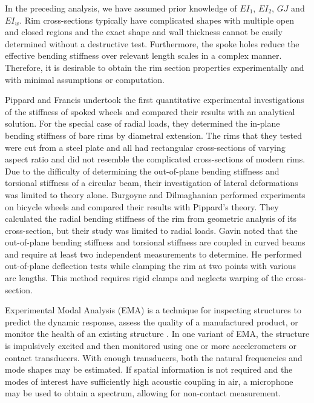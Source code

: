 \documentclass[../thesis.tex]{subfiles}
\begin{document}
In the preceding analysis, we have assumed prior knowledge of $EI_1$, $EI_2$, $GJ$ and $EI_w$. Rim cross-sections typically have complicated shapes with multiple open and closed regions and the exact shape and wall thickness cannot be easily determined without a destructive test. Furthermore, the spoke holes reduce the effective bending stiffness over relevant length scales in a complex manner. Therefore, it is desirable to obtain the rim section properties experimentally and with minimal assumptions or computation.

Pippard and Francis \cite{Pippard1931} undertook the first quantitative experimental investigations of the stiffness of spoked wheels and compared their results with an analytical solution. For the special case of radial loads, they determined the in-plane bending stiffness of bare rims by diametral extension. The rims that they tested were cut from a steel plate and all had rectangular cross-sections of varying aspect ratio and did not resemble the complicated cross-sections of modern rims. Due to the difficulty of determining the out-of-plane bending stiffness and torsional stiffness of a circular beam, their investigation of lateral deformations was limited to theory alone. Burgoyne and Dilmaghanian \cite{Burgoyne1993} performed experiments on bicycle wheels and compared their results with Pippard's theory. They calculated the radial bending stiffness of the rim from geometric analysis of its cross-section, but their study was limited to radial loads. Gavin \cite{Gavin1996} noted that the out-of-plane bending stiffness and torsional stiffness are coupled in curved beams and require at least two independent measurements to determine. He performed out-of-plane deflection tests while clamping the rim at two points with various arc lengths. This method requires rigid clamps and neglects warping of the cross-section.

Experimental Modal Analysis (EMA) \cite{Ewins1984} is a technique for inspecting structures to predict the dynamic response, assess the quality of a manufactured product, or monitor the health of an existing structure \cite{Salawu1997}. In one variant of EMA, the structure is impulsively excited and then monitored using one or more accelerometers or contact transducers. With enough transducers, both the natural frequencies and mode shapes may be estimated. If spatial information is not required and the modes of interest have sufficiently high acoustic coupling in air, a microphone may be used to obtain a spectrum, allowing for non-contact measurement.
\end{document}
